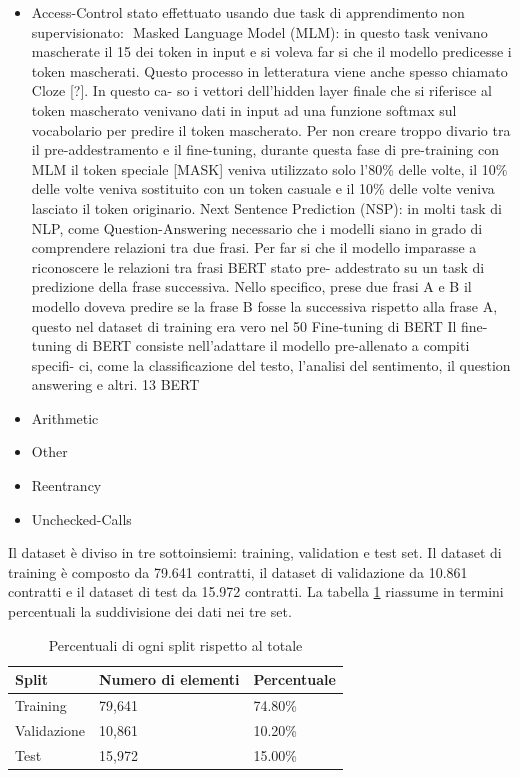 \documentclass[../../Thesis.tex]{subfiles}
\begin{document}
\begin{itemize}
    \item Access-Control stato effettuato usando due task di apprendimento non
    supervisionato:
     Masked Language Model (MLM): in questo task venivano mascherate il 15%
    dei token in input e si voleva far si che il modello predicesse i token mascherati.
    Questo processo in letteratura viene anche spesso chiamato Cloze [?]. In questo ca-
    so i vettori dell’hidden layer finale che si riferisce al token mascherato venivano dati
    in input ad una funzione softmax sul vocabolario per predire il token mascherato.
    Per non creare troppo divario tra il pre-addestramento e il fine-tuning, durante
    questa fase di pre-training con MLM il token speciale [MASK] veniva utilizzato
    solo l’80\% delle volte, il 10\% delle volte veniva sostituito con un token casuale e il
    10\% delle volte veniva lasciato il token originario.
    Next Sentence Prediction (NSP): in molti task di NLP, come Question-Answering
    necessario che i modelli siano in grado di comprendere relazioni tra due frasi. Per
    far si che il modello imparasse a riconoscere le relazioni tra frasi BERT stato pre-
    addestrato su un task di predizione della frase successiva. Nello specifico, prese
    due frasi A e B il modello doveva predire se la frase B fosse la successiva rispetto
    alla frase A, questo nel dataset di training era vero nel 50%
    Fine-tuning di BERT
    Il fine-tuning di BERT consiste nell’adattare il modello pre-allenato a compiti specifi-
    ci, come la classificazione del testo, l’analisi del sentimento, il question answering e altri.
    13
    BERT
    \item Arithmetic
    \item Other
    \item Reentrancy
    \item Unchecked-Calls
\end{itemize}
 
Il dataset è diviso in tre sottoinsiemi: training, validation e test set.
Il dataset di training è composto da 79.641 contratti, il dataset di validazione da 10.861 contratti e il dataset di test da 15.972 contratti. La tabella \ref{tab:split} riassume in termini percentuali la suddivisione dei dati nei tre set.
\begin{table}[h!]
    \centering
    \begin{tabular}{|l|l|l|}
    \hline
    \textbf{Split} & \textbf{Numero di elementi} & \textbf{Percentuale} \\ \hline
    Training       & 79,641                        & 74.80\%               \\ \hline
    Validazione    & 10,861                        & 10.20\%               \\ \hline
    Test           & 15,972                        & 15.00\%               \\ \hline
    \end{tabular}
    \caption{Percentuali di ogni split rispetto al totale}
    \label{tab:split}
\end{table}
    
\end{document}
